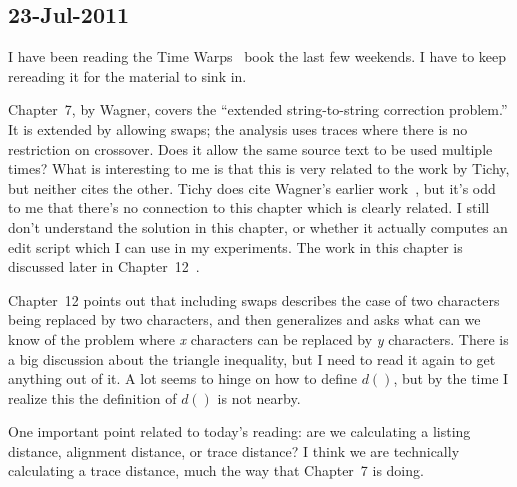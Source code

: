 \subsection{23-Jul-2011}

I have been reading the Time Warps~\cite{Sankoff1999} book the last few
weekends.  I have to keep rereading it for the material to sink in.


Chapter~7, by Wagner, covers the ``extended string-to-string correction
problem.''
It is extended by allowing swaps; the analysis uses traces
where there is no restriction on crossover.
Does it allow the same source text to be used multiple times?
What is interesting to me is that this is very related to
the work by Tichy, but neither cites the other.
Tichy does cite Wagner's earlier work~\cite{Wagner1974},
but it's odd to me that there's no connection to this
chapter which is clearly related.
I still don't understand the solution in this chapter,
or whether it actually computes an edit script which I
can use in my experiments.
The work in this chapter is discussed later
in Chapter~12~\cite[p.~302]{Sankoff1999}.


Chapter~12 points out that including swaps describes
the case of two characters being replaced by two characters,
and then generalizes and asks what can we know of the problem
where \textit{x} characters can be replaced by \textit{y} characters.
There is a big discussion about the triangle inequality,
but I need to read it again to get anything out of it.
A lot seems to hinge on how to define $d()$, but by the
time I realize this the definition of $d()$ is not nearby.

One important point related to today's reading:
are we calculating a listing distance, alignment distance, or
trace distance?
I think we are technically calculating a trace distance,
much the way that Chapter~7 is doing.

